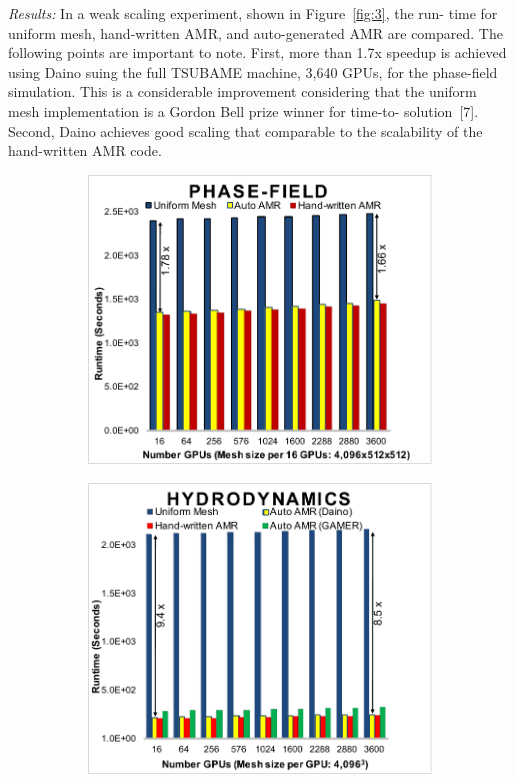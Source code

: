 \documentclass{book}
\begin{document}
\emph{Results:} In a weak scaling experiment, shown in Figure~\ref{fig:3}, the run- time for uniform mesh, hand-written AMR, and auto-generated AMR are compared. The following points are important to note. First, more than 1.7x speedup is achieved using Daino suing the full TSUBAME machine, 3,640 GPUs, for the phase-field simulation. This is a considerable improvement considering that the uniform mesh implementation is a Gordon Bell prize winner for time-to- solution~[7]. Second, Daino achieves good scaling that comparable to the scalability of the hand-written AMR code.
\begin{figure}
\centering
\begin{subfigure}[t]{0.32\textwidth}
\centering
\includegraphics[width=\textwidth]{figs/amr03.pdf} 
\end{subfigure}
\begin{subfigure}[t]{0.32\textwidth}
\centering
\includegraphics[width=\textwidth]{figs/amr04.pdf} 

\end{subfigure}
\end{figure}
\end{document}

